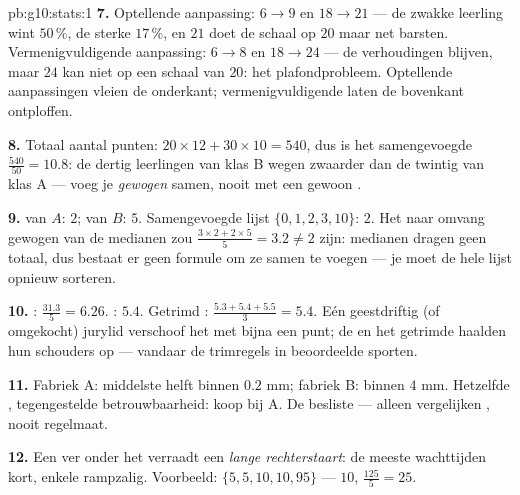 \begin{solution}{pb:g10:stats:1}
\textbf{7.} Optellende aanpassing: $6 \to 9$ en $18 \to 21$ --- de zwakke
leerling wint $50\,\%$, de sterke $17\,\%$, en $21$ doet de schaal op $20$
maar net barsten. Vermenigvuldigende aanpassing: $6 \to 8$ en $18 \to 24$ ---
de verhoudingen blijven, maar $24$ kan niet op een schaal van $20$: het
plafondprobleem. Optellende aanpassingen vleien de onderkant;
vermenigvuldigende laten de bovenkant ontploffen.

\textbf{8.} Totaal aantal punten: $20 \times 12 + 30 \times 10 = 540$, dus is
het samengevoegde  $\frac{540}{50} = 10.8$: de dertig leerlingen
van klas B wegen zwaarder dan de twintig van klas A ---  voeg je
\emph{gewogen} samen, nooit met een gewoon .

\textbf{9.}  van $A$: $2$; van $B$: $5$. Samengevoegde lijst
$\{0, 1, 2, 3, 10\}$:  $2$. Het naar omvang gewogen  van de
medianen zou $\frac{3 \times 2 + 2 \times 5}{5} = 3.2 \neq 2$ zijn: medianen
dragen geen totaal, dus bestaat er geen formule om ze samen te voegen ---
je moet de hele lijst opnieuw sorteren.

\textbf{10.} : $\frac{31.3}{5} = 6.26$. : $5.4$. Getrimd
: $\frac{5.3 + 5.4 + 5.5}{3} = 5.4$. Eén geestdriftig (of omgekocht)
jurylid verschoof het  met bijna een punt; de  en het
getrimde  haalden hun schouders op --- vandaar de trimregels in
beoordeelde sporten.

\textbf{11.} Fabriek A: middelste helft binnen $0.2$ mm; fabriek B: binnen
$4$ mm. Hetzelfde , tegengestelde betrouwbaarheid: koop bij A. De
 besliste ---  alleen vergelijken ,
nooit regelmaat.

\textbf{12.} Een  ver onder het  verraadt een \emph{lange
rechterstaart}: de meeste wachttijden kort, enkele rampzalig. Voorbeeld:
$\{5, 5, 10, 10, 95\}$ ---  $10$,  $\frac{125}{5} = 25$.


\end{solution}
